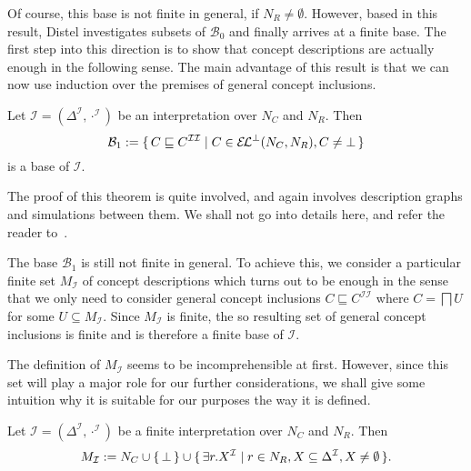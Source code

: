 Of course, this base is not finite in general, \ie if $N_R \neq \emptyset$.  However,
based in this result, Distel investigates subsets of $\mathcal{B}_0$ and finally arrives
at a finite base.  The first step into this direction is to show that \ELbot concept
descriptions are actually enough in the following sense.  The main advantage of this
result is that we can now use induction over the premises of general concept inclusions.

\begin{Theorem}
  \label{thm:Felix-base-B1}
  Let $\mathcal{I} = (\Delta^{\mathcal{I}}, \cdot^{\mathcal{I}})$ be an interpretation
  over $N_C$ and $N_R$.  Then
  \begin{equation}
    \label{eq:21}
    \mathcal{B}_1 := {\{\, C \sqsubseteq C^{\mathcal{I}\mathcal{I}} \mid C \in {\ensuremath{{\mathcal{E}\kern-.3ex\mathcal{L}}^\bot}}(N_C,
      N_R), C \neq \bot \,\}}
  \end{equation}
  is a base of $\mathcal{I}$.
\end{Theorem}

The proof of this theorem is quite involved, and again involves \EL description graphs and
simulations between them.  We shall not go into details here, and refer the reader
to~\cite[Section 5.1.1]{Diss-Felix}.

The base $\mathcal{B}_1$ is still not finite in general.  To achieve this, we consider a
particular finite set $M_{\mathcal{I}}$ of concept descriptions which turns out to be
enough in the sense that we only need to consider general concept inclusions $C
\sqsubseteq C^{\mathcal{I}\mathcal{I}}$ where $C = \bigsqcap U$ for some $U \subseteq
M_{\mathcal{I}}$.  Since $M_{\mathcal{I}}$ is finite, the so resulting set of general
concept inclusions is finite and is therefore a finite base of $\mathcal{I}$.

The definition of $M_{\mathcal{I}}$ seems to be incomprehensible at first.  However, since
this set will play a major role for our further considerations, we shall give some
intuition why it is suitable for our purposes the way it is defined.

\begin{Definition}[$M_{\mathcal{I}}$]
  \label{def:M_I}
  Let $\mathcal{I} = (\Delta^{\mathcal{I}}, \cdot^{\mathcal{I}})$ be a finite
  interpretation over $N_C$ and $N_R$.  Then
  \begin{equation*}
    M_{\mathcal{I}} := N_C \cup {\ensuremath{\{\, \bot \,\}}} \cup {\ensuremath{\{\, \exists r. X^{\mathcal{I}} \mid
      r \in N_R, X \subseteq \Delta^{\mathcal{I}}, X \neq \emptyset \,\}}}.
  \end{equation*}
\end{Definition}

